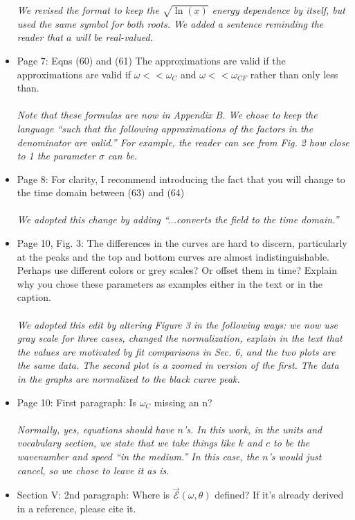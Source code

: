 \documentclass[12pt]{article}
\begin{document}
\begin{itemize}
\textit{We revised the format to keep the $\sqrt{\ln(x)}$ energy dependence by itself, but used the same symbol for both roots.  We added a sentence reminding the reader that $a$ will be real-valued.}
\item Page 7: Eqns (60) and (61) The approximations are valid if the approximations are valid if $\omega << \omega_C$ and $\omega << \omega_{CF}$ rather than only less than. \\ \\
\textit{Note that these formulas are now in Appendix B.  We chose to keep the language ``such that the following approximations of the factors in the denominator are valid.'' For example, the reader can see from Fig. 2 how close to 1 the parameter $\sigma$ can be.}
\item Page 8: For clarity, I recommend introducing the fact that you will change to the time domain between (63) and (64) \\ \\
\textit{We adopted this change by adding ``...converts the field to the time domain.''}
\item Page 10, Fig. 3: The differences in the curves are hard to discern, particularly at the peaks and the top and bottom curves are almost indistinguishable. Perhaps use different colors or grey scales? Or offset them in time? Explain why you chose these parameters as examples either in the text or in the caption. \\ \\ 
\textit{We adopted this edit by altering Figure 3 in the following ways: we now use gray scale for three cases, changed the normalization, explain in the text that the values are motivated by fit comparisons in Sec. 6, and the two plots are the same data.  The second plot is a zoomed in version of the first.  The data in the graphs are normalized to the black curve peak.}
\item Page 10: First paragraph: Is $\omega_C$ missing an n? \\ \\
\textit{Normally, yes, equations should have $n$'s.  In this work, in the units and vocabulary section, we state that we take things like $k$ and $c$ to be the wavenumber and speed ``in the medium.''  In this case, the $n$'s would just cancel, so we chose to leave it as is.}
\item Section V: 2nd paragraph: Where is $\mathcal{\vec{E}}( \omega, \theta)$ defined? If it's already derived in a reference, please cite it. \\ \\

\end{itemize}
\end{document}
